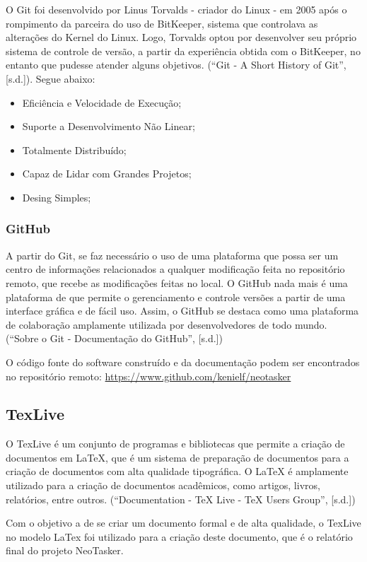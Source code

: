 \documentclass[a4paper,12pt]{article}
\begin{document}
O Git foi desenvolvido por Linus Torvalds - criador do Linux - em 2005 após o rompimento da parceira do uso de BitKeeper, sistema que controlava
as alterações do Kernel do Linux. Logo, Torvalds optou por desenvolver seu próprio sistema de controle de versão, a partir da experiência obtida com o BitKeeper, 
no entanto que pudesse atender alguns objetivos. (“Git - A Short History of Git”, [s.d.]). Segue abaixo:
\begin{itemize}
	\item Eficiência e Velocidade de Execução;
	\item Suporte a Desenvolvimento Não Linear;
	\item Totalmente Distribuído;
	\item Capaz de Lidar com Grandes Projetos;
	\item Desing Simples;
\end{itemize}


\subsubsection{GitHub}
A partir do Git, se faz necessário o uso de uma plataforma que possa ser um centro de informações relacionados a qualquer modificação feita no repositório remoto, 
que recebe as modificações feitas no local. O GitHub nada mais é uma plataforma de que permite o gerenciamento e controle versões a partir de uma interface gráfica 
e de fácil uso. Assim, o GitHub se destaca como uma plataforma de colaboração amplamente utilizada por desenvolvedores de todo mundo.
(“Sobre o Git - Documentação do GitHub”, [s.d.])

O código fonte do software construído e da documentação podem ser encontrados no repositório remoto:
\url{https://www.github.com/kenielf/neotasker}

\subsection{TexLive}
O TexLive é um conjunto de programas e bibliotecas que permite a criação de documentos em LaTeX, que é um sistema de preparação de documentos para a criação de documentos
com alta qualidade tipográfica. O LaTeX é amplamente utilizado para a criação de documentos acadêmicos, como artigos, livros, relatórios, entre outros. (“Documentation - TeX Live - TeX Users Group”, [s.d.])

Com o objetivo a de se criar um documento formal e de alta qualidade, o TexLive no modelo LaTex foi utilizado para a criação deste documento, que é o relatório final do projeto NeoTasker.
\end{document}
